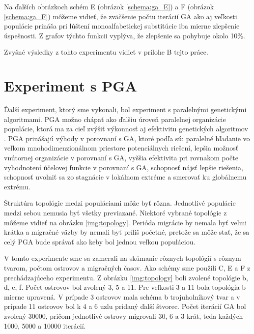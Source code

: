 Na ďalších obrázkoch schém E (obrázok \ref{schema:ga_E}) a F (obrázok \ref{schema:ga_F}) môžeme vidieť, že zväčšenie počtu iterácií GA ako aj veľkosti populácie prináša pri lúštení monoalfabetickej substitúcie iba mierne zlepšenie úspešnosti. Z grafov týchto funkcii vyplýva, že zlepšenie sa pohybuje okolo 10\%.



Zvyšné výsledky z tohto experimentu vidieť v prílohe B tejto práce.

\clearpage
\section{Experiment s PGA}
Ďalší experiment, ktorý sme vykonali, bol experiment s paralelnými genetickými algoritmami. PGA možno chápať ako ďalšiu úroveň paralelnej organizácie populácie, ktorá ma za cieľ zvýšiť výkonnosť aj efektivitu genetických algoritmov \cite{pea}.
PGA prinášajú výhody v porovnaní s GA, ktoré podľa \cite{pea} sú: paralelné hľadanie vo veľkom mnohodimenzionálnom priestore potenciálnych riešení, lepšia možnosť vnútornej organizácie v porovnaní s GA, vyššia efektivita pri rovnakom počte vyhodnotení účelovej funkcie v porovnaní s GA, schopnosť nájsť lepšie riešenia, schopnosť uvolniť sa zo stagnácie v lokálnom extréme a smerovať ku globálnemu extrému.

Štruktúra topológie medzi populáciami môže byť rôzna. Jednotlivé populácie medzi sebou nemusia byť všetky previazané.
Niektoré vybrané topológie z \cite{pea} môžeme vidieť na obrázku \ref{img:topology}.
Perióda migrácie by nemala byť veľmi krátka a migračné väzby by nemali byť príliš početné, pretože sa môže stať, že sa celý PGA bude správať ako keby bol jednou veľkou populáciou.

V tomto experimente sme sa zamerali na skúmanie rôznych topológií s rôznym tvarom, počtom ostrovov a migračných časov. Ako schémy sme použili C, E a F z prechádzajúceho experimentu.
Z obrázku \ref{img:topology} boli zvolené topológie b, d, e, f. Počet ostrovov bol zvolený 3, 5 a 11. Pre veľkosti 3 a 11 bola topológia b mierne upravená.
V prípade 3 ostrovov mala schéma b trojuholníkový tvar a v prípade 11 ostrovov bol k 4 a 6 uzlu pridaný ďalší štvorec.
Počet iterácií GA bol zvolený 30000, pričom jednotlivé ostrovy migrovali 30, 6 a 3 krát, teda každých 1000, 5000 a 10000 iterácií.

